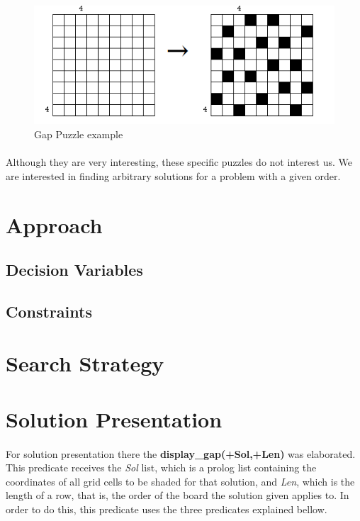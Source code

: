 \documentclass[runningheads]{llncs}
\begin{document}
\begin{figure}
\includegraphics[width=\textwidth]{images/figure1.png}
\caption{Gap Puzzle example} \label{fig1}
\end{figure}
    
\paragraph{}
Although they are very interesting, these specific puzzles do not interest us. We are interested in finding arbitrary 
solutions for a problem with a given order.


\section{Approach}

\subsection{Decision Variables}

\subsection{Constraints}

\section{Search Strategy}


\section{Solution Presentation}
\paragraph{}
For solution presentation there the \textbf{display\_gap(+Sol,+Len)} was elaborated. This predicate receives the \textit{Sol}
list, which is a prolog list containing the coordinates of all grid cells to be shaded for that solution, and \textit{Len},
which is the length of a row, that is, the order of the board the solution given applies to. In order to do this, this 
predicate uses the three predicates explained bellow.
\end{document}
